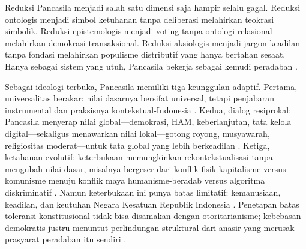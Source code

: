 \documentclass[journal]{IEEEtran}
\begin{document}
Reduksi Pancasila menjadi salah satu dimensi saja hampir selalu gagal. Reduksi ontologis menjadi simbol ketuhanan tanpa deliberasi melahirkan teokrasi simbolik. Reduksi epistemologis menjadi voting tanpa ontologi relasional melahirkan demokrasi transaksional. Reduksi aksiologis menjadi jargon keadilan tanpa fondasi melahirkan populisme distributif yang hanya bertahan sesaat. Hanya sebagai sistem yang utuh, Pancasila bekerja sebagai kemudi peradaban \cite{latif2018,madungmere2021,pristiwiyanto2021}.

Sebagai ideologi terbuka, Pancasila memiliki tiga keunggulan adaptif. Pertama, universalitas berakar: nilai dasarnya bersifat universal, tetapi penjabaran instrumental dan praksisnya kontekstual-Indonesia \cite{notonagoro1975,latif2018}. Kedua, dialog resiprokal: Pancasila menyerap nilai global---demokrasi, HAM, keberlanjutan, tata kelola digital---sekaligus menawarkan nilai lokal---gotong royong, musyawarah, religiositas moderat---untuk tata global yang lebih berkeadilan \cite{ulumhamida2018,kurniasih2016,effend2024}. Ketiga, ketahanan evolutif: keterbukaan memungkinkan rekontekstualisasi tanpa mengubah nilai dasar, misalnya bergeser dari konflik fisik kapitalisme-versus-komunisme menuju konflik maya humanisme-beradab versus algoritma diskriminatif \cite{rahmatullah2022,kominfo2023}. Namun keterbukaan ini punya batas limitatif: kemanusiaan, keadilan, dan keutuhan Negara Kesatuan Republik Indonesia \cite{uud1945,assiddiqie2006}. Penetapan batas toleransi konstitusional tidak bisa disamakan dengan otoritarianisme; kebebasan demokratis justru menuntut perlindungan struktural dari anasir yang merusak prasyarat peradaban itu sendiri \cite{kim2024,suntana2023}.
\end{document}
